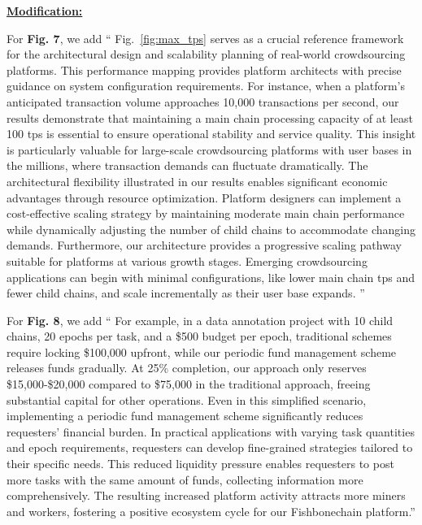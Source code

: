 {{\noindent \underline{\textbf{Modification:}}

For \textbf{Fig. 7}, we add
``
Fig.~\ref{fig:max_tps} serves as a crucial reference framework for the architectural design and scalability planning of real-world crowdsourcing platforms. This performance mapping provides platform architects with precise guidance on system configuration requirements. For instance, when a platform's anticipated transaction volume approaches 10,000 transactions per second, our results demonstrate that maintaining a main chain processing capacity of at least 100 tps is essential to ensure operational stability and service quality. This insight is particularly valuable for large-scale crowdsourcing platforms with user bases in the millions, where transaction demands can fluctuate dramatically. The architectural flexibility illustrated in our results enables significant economic advantages through resource optimization. Platform designers can implement a cost-effective scaling strategy by maintaining moderate main chain performance while dynamically adjusting the number of child chains to accommodate changing demands. Furthermore, our architecture provides a progressive scaling pathway suitable for platforms at various growth stages. Emerging crowdsourcing applications can begin with minimal configurations, like lower main chain tps and fewer child chains, and scale incrementally as their user base expands. ''


For \textbf{Fig. 8}, we add
``
For example, in a data annotation project with 10 child chains, 20 epochs per task, and a \$500 budget per epoch, traditional schemes require locking \$100,000 upfront, while our periodic fund management scheme releases funds gradually. At 25\% completion, our approach only reserves \$15,000-\$20,000 compared to \$75,000 in the traditional approach, freeing substantial capital for other operations. Even in this simplified scenario, implementing a periodic fund management scheme significantly reduces requesters' financial burden. In practical applications with varying task quantities and epoch requirements, requesters can develop fine-grained strategies tailored to their specific needs. This reduced liquidity pressure enables requesters to post more tasks with the same amount of funds, collecting information more comprehensively. The resulting increased platform activity attracts more miners and workers, fostering a positive ecosystem cycle for our Fishbonechain platform.''
} %

}